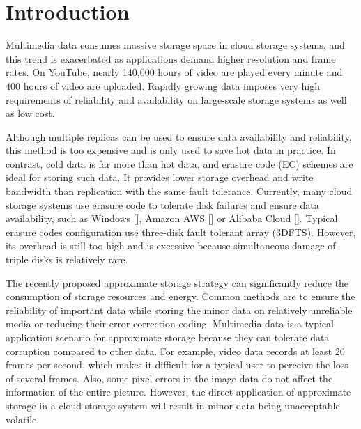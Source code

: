 \documentclass[sigconf]{acmart}
\begin{document}
\maketitle

\section{Introduction}
Multimedia data consumes massive storage space in cloud storage systems, and this trend is exacerbated as applications demand higher resolution and frame rates. On YouTube, nearly 140,000 hours of video are played every minute and 400 hours of video are uploaded. Rapidly growing data imposes very high requirements of reliability and availability on large-scale storage systems as well as low cost.

Although multiple replicas can be used to ensure data availability and reliability, this method is too expensive and is only used to save hot data in practice. In contrast, cold data is far more than hot data, and erasure code (EC) schemes are ideal for storing such data. It provides lower storage overhead and write bandwidth than replication with the same fault tolerance. Currently, many cloud storage systems use erasure code to tolerate disk failures and ensure data availability, such as Windows [], Amazon AWS [] or Alibaba Cloud []. Typical erasure codes configuration use three-disk fault tolerant array (3DFTS). However, its overhead is still too high and is excessive because simultaneous damage of triple disks is relatively rare. 

The recently proposed approximate storage strategy can significantly reduce the consumption of storage resources and energy. Common methods are to ensure the reliability of important data while storing the minor data on relatively unreliable media or reducing their error correction coding. Multimedia data is a typical application scenario for approximate storage because they can tolerate data corruption compared to other data. For example, video data records at least 20 frames per second, which makes it difficult for a typical user to perceive the loss of several frames. Also, some pixel errors in the image data do not affect the information of the entire picture. However, the direct application of approximate storage in a cloud storage system will result in minor data being unacceptable volatile.
\end{document}
